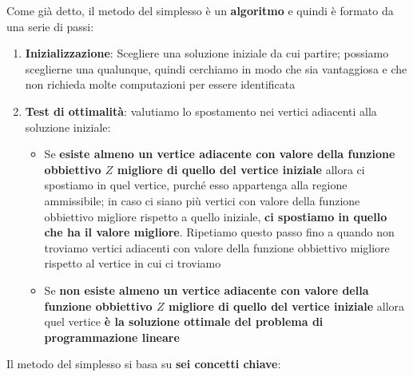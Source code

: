 \documentclass[12pt]{article}
\begin{document}
Come già detto, il metodo del simplesso è un \textbf{algoritmo} e quindi è formato da una serie di passi:
\begin{enumerate}
    \item \textbf{Inizializzazione}: Scegliere una soluzione iniziale da cui partire; possiamo sceglierne una qualunque, quindi cerchiamo in modo che sia vantaggiosa e che non richieda molte computazioni per essere identificata
    \item \textbf{Test di ottimalità}: valutiamo lo spostamento nei vertici adiacenti alla soluzione iniziale:
    \begin{itemize}
        \item Se \textbf{esiste almeno un vertice adiacente con valore della funzione obbiettivo $Z$ migliore di quello del vertice iniziale} allora ci spostiamo in quel vertice, purché esso appartenga alla regione ammissibile; in caso ci siano più vertici
        con valore della funzione obbiettivo migliore rispetto a quello iniziale, \textbf{ci spostiamo in quello che ha il valore migliore}. Ripetiamo questo passo fino a quando non troviamo vertici adiacenti con valore della funzione obbiettivo migliore rispetto al vertice in cui ci troviamo
        \item Se \textbf{non esiste almeno un vertice adiacente con valore della funzione obbiettivo $Z$ migliore di quello del vertice iniziale} allora quel vertice \textbf{è la soluzione ottimale del problema di programmazione lineare} 
    \end{itemize}
\end{enumerate}
Il metodo del simplesso si basa su \textbf{sei concetti chiave}:
\end{document}
